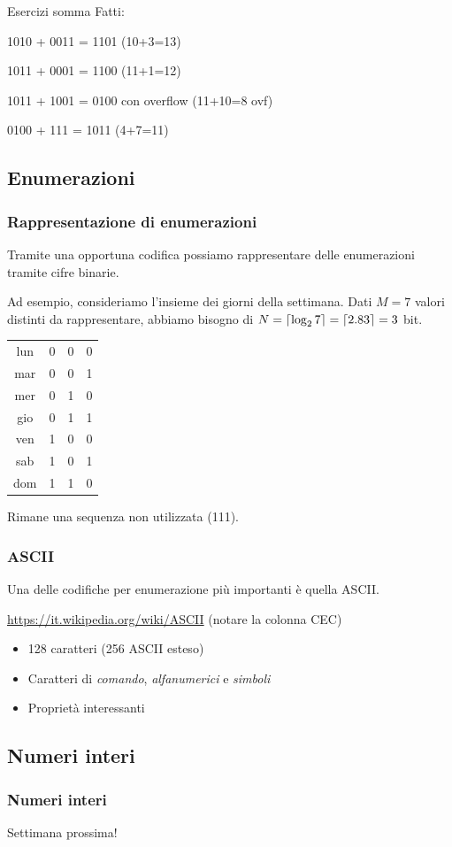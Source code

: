 \documentclass[handout]{beamer}
\DeclarePairedDelimiter{\ceil}{\lceil}{\rceil}
\begin{document}
\begin{frame}{Esercizi somma}
Fatti:

1010 + 0011 = 1101 (10+3=13)

1011 + 0001 = 1100 (11+1=12)

1011 + 1001 = 0100 con overflow (11+10=8 ovf)

0100 + 111 = 1011 (4+7=11)
\end{frame}


\subsection{Enumerazioni}
\begin{frame}
\frametitle{Rappresentazione di enumerazioni}
Tramite una opportuna codifica possiamo rappresentare delle enumerazioni tramite cifre binarie.
\pause

Ad esempio, consideriamo l'insieme dei giorni della settimana. Dati $M=7$ valori distinti da rappresentare, abbiamo bisogno di $N=\ceil{\log_2 7}=\ceil{2.83}=3$ bit. 
\pause

\begin{table}[h]
	\begin{tabular}{cccc}
		lun&0&0&0\\
		mar&0&0&1\\
		mer&0&1&0\\
		gio&0&1&1\\
		ven&1&0&0\\
		sab&1&0&1\\
		dom&1&1&0
	\end{tabular}
\end{table}

Rimane una sequenza non utilizzata (111).
\end{frame}

\begin{frame}
\frametitle{ASCII}
Una delle codifiche per enumerazione più importanti è quella ASCII.

\href{https://it.wikipedia.org/wiki/ASCII}{https://it.wikipedia.org/wiki/ASCII} (notare la colonna CEC)

\begin{itemize}
	\item 128 caratteri (256 ASCII esteso)
	\item Caratteri di \emph{comando}, \emph{alfanumerici} e \emph{simboli}
	\item Proprietà interessanti
\end{itemize}

\end{frame}

\subsection{Numeri interi}
\begin{frame}
\frametitle{Numeri interi}
Settimana prossima!
\end{frame}
\end{document}
